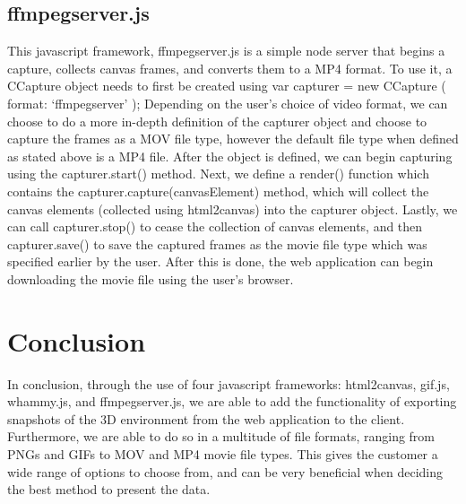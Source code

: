 \documentclass[letterpaper,10pt,titlepage, onecolumn, draftclsnofoot]{IEEEtran}
\begin{document}
\subsection{ffmpegserver.js}
This javascript framework, ffmpegserver.js\cite{ffmpegserver.js} is a simple node server that begins a capture, collects canvas frames, and converts them to a MP4 format. To use it, a CCapture object needs to first be created using var capturer = new CCapture ( { format: ‘ffmpegserver’ } ); Depending on the user’s choice of video format, we can choose to do a more in-depth definition of the capturer object and choose to capture the frames as a MOV file type, however the default file type when defined as stated above is a MP4 file. After the object is defined, we can begin capturing using the capturer.start() method. Next, we define a render() function which contains the capturer.capture(canvasElement) method, which will collect the canvas elements (collected using html2canvas) into the capturer object. Lastly, we can call capturer.stop() to cease the collection of canvas elements, and then capturer.save() to save the captured frames as the movie file type which was specified earlier by the user. After this is done, the web application can begin downloading the movie file using the user’s browser.

\section{Conclusion}
In conclusion, through the use of four javascript frameworks: html2canvas, gif.js, whammy.js, and ffmpegserver.js, we are able to add the functionality of exporting snapshots of the 3D environment from the web application to the client. Furthermore, we are able to do so in a multitude of file formats, ranging from PNGs and GIFs to MOV and MP4 movie file types. This gives the customer a wide range of options to choose from, and can be very beneficial when deciding the best method to present the data. 

\newpage  



\end{document}
